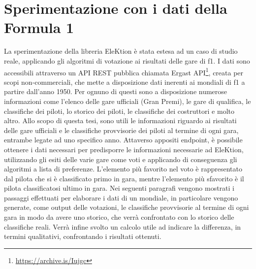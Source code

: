 \documentclass[12pt,a4paper,openright,twoside]{book}
\begin{document}
\chapter{Sperimentazione con i dati della Formula 1}
La sperimentazione della libreria EleKtion è stata estesa ad un
caso di studio reale, applicando gli algoritmi di votazione ai risultati 
delle gare di \ac{f1}.
I dati sono accessibili attraverso un API REST pubblica chiamata Ergast API\footnote{\url{https://archive.is/Iujgc}},
creata per scopi non-commerciali,
che mette a disposizione dati inerenti ai mondiali di \ac{f1} a partire dall'anno 1950.
Per ognuno di questi sono a disposizione numerose informazioni come l'elenco delle gare ufficiali (Gran Premi),
le gare di qualifica, le classifiche dei piloti, lo storico
dei piloti, le classifiche dei costruttori e molto altro.
Allo scopo di questa tesi, sono utili le informazioni riguardo ai risultati delle gare ufficiali
e le classifiche provvisorie dei piloti al termine di ogni gara, entrambe legate ad uno specifico anno.
Attaverso appositi endpoint, è possibile ottenere i dati necessari per predisporre le informazioni necessarie
ad EleKtion, utilizzando gli esiti delle varie gare come voti e applicando di conseguenza gli algoritmi a lista di preferenze.
L'elemento più favorito nel voto è rappresentato dal pilota che si è classificato primo in gara, mentre l'elemento più sfavorito
è il pilota classificatosi ultimo in gara.
Nei seguenti paragrafi vengono mostrati i passaggi effettuati per elaborare i dati di un mondiale,
in particolare vengono generate, come output delle votazioni, le classifiche provvisorie al termine di ogni gara in modo da avere uno storico,
che verrà confrontato con lo storico delle classifiche reali.
Verrà infine svolto un calcolo utile ad indicare
la differenza, in termini qualitativi, confrontando i risultati ottenuti.
\end{document}
